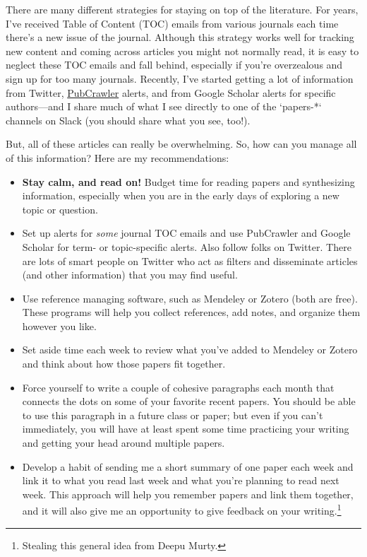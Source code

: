 \documentclass[letterpaper,11pt,oneside]{memoir}
\begin{document}
There are many different strategies for staying on top of the literature. For years, I've received Table of Content (TOC) emails from various journals each time there's a new issue of the journal. Although this strategy works well for tracking new content and coming across articles you might not normally read, it is easy to neglect these TOC emails and fall behind, especially if you're overzealous and sign up for too many journals. Recently, I've started getting a lot of information from Twitter, \href{http://pubcrawler.gen.tcd.ie/}{PubCrawler} alerts, and from Google Scholar alerts for specific authors---and I share much of what I see directly to one of the `papers-*` channels on Slack (you should share what you see, too!).

But, all of these articles can really be overwhelming. So, how can you manage all of this information? Here are my recommendations:

\begin{itemize}
\item \textbf{Stay calm, and read on!} Budget time for reading papers and synthesizing information, especially when you are in the early days of exploring a new topic or question. 
\item Set up alerts for \textit{some} journal TOC emails and use PubCrawler and Google Scholar for term- or topic-specific alerts. Also follow folks on Twitter. There are lots of smart people on Twitter who act as filters and disseminate articles (and other information) that you may find useful.
\item Use reference managing software, such as Mendeley or Zotero (both are free). These programs will help you collect references, add notes, and organize them however you like. 
\item Set aside time each week to review what you've added to Mendeley or Zotero and think about how those papers fit together.
\item Force yourself to write a couple of cohesive paragraphs each month that connects the dots on some of your favorite recent papers. You should be able to use this paragraph in a future class or paper; but even if you can't immediately, you will have at least spent some time practicing your writing and getting your head around multiple papers.
\item Develop a habit of sending me a short summary of one paper each week and link it to what you read last week and what you're planning to read next week. This approach will help you remember papers and link them together, and it will also give me an opportunity to give feedback on your writing.\footnote{Stealing this general idea from Deepu Murty.}
\end{itemize}
\end{document}
